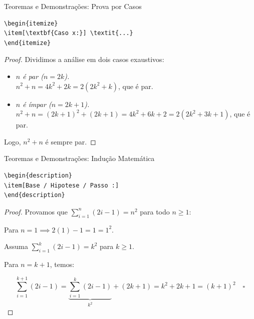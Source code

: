 \documentclass[aspectratio=169,xcolor=dvipsnames]{beamer}
\begin{document}
\begin{frame}[fragile]{Teoremas e Demonstrações: Prova por Casos}

\begin{lstlisting}
\begin{itemize}
\item[\textbf{Caso x:}] \textit{...}
\end{itemize}
\end{lstlisting}

    \begin{proof}
    Dividimos a análise em dois casos exaustivos:
    \begin{itemize}
        \item[\textbf{Caso 1:}] \textit{$n$ é par ($n = 2k$).} \\
        $n^2 + n = 4k^2 + 2k = 2(2k^2 + k)$, que é par.
        
        \item[\textbf{Caso 2:}] \textit{$n$ é ímpar ($n = 2k + 1$).} \\
        $n^2 + n = (2k+1)^2 + (2k+1) = 4k^2 + 6k + 2 = 2(2k^2 + 3k + 1)$, que é par.
    \end{itemize}
    Logo, $n^2 + n$ é sempre par.
    \end{proof}

\end{frame}

\begin{frame}[fragile]{Teoremas e Demonstrações: Indução Matemática}

\begin{lstlisting}
\begin{description}
\item[Base / Hipotese / Passo :] 
\end{description}
\end{lstlisting}

   \begin{proof}
    Provamos que $\sum_{i=1}^{n} (2i - 1) = n^2$ para todo $n \ge 1$:

    \begin{description}\setlength{\itemsep}{0pt}
        \item[Base:] Para $n=1 \implies 2(1)-1 = 1 = 1^2$. \checkmark
        \item[Hipótese:] Assuma $\sum_{i=1}^{k} (2i - 1) = k^2$ para $k \ge 1$.
        \item[Passo:] Para $n=k+1$, temos:
    \end{description}
    \[
    \sum_{i=1}^{k+1} (2i - 1) = \underbrace{\sum_{i=1}^{k} (2i - 1)}_{k^2} + (2k + 1) = k^2 + 2k + 1 = (k+1)^2 \quad \square
    \]
    \end{proof}

\end{frame}
\end{document}
